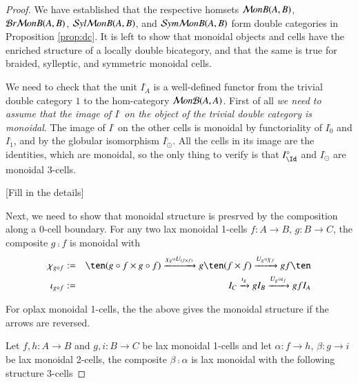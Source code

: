 \begin{proof}
We have established that the respective homsets $\mathcal{M} onB(A,B)$, $\mathcal{B} r \mathcal{M} onB(A,B)$, $\mathcal{S} yl \mathcal{M} onB(A,B)$, and $\mathcal{S} ym \mathcal{M} onB(A,B)$ form double categories in Proposition \ref{prop:dc}. It is left to show that monoidal objects and cells have the enriched structure of a locally double bicategory, and that the same is true for braided, sylleptic, and symmetric monoidal cells.

We need to check that the unit $I^{\comp}_A$ is a well-defined functor from the trivial double category $1$ to the hom-category $\mathcal{M} on\mathcal{B}(A,A)$. 
First of all {\it we need to assume that the image of $I^{\comp}$ on the object of the trivial double category is monoidal}. The image of $I^{\comp}$ on the other cells is monoidal by functoriality of $I^{\comp}_0$ and $I^{\comp}_1$, and by the globular isomorphism $I^{\comp}_{\odot}$.
All the cells in its image are the identities, which are monoidal, so the only thing to verify is that $I^{\comp}_{\looseid}$ and $I^{\comp}_{\odot}$ are monoidal 3-cells. 

[Fill in the details]

Next, we need to show that monoidal structure is presrved by the composition along a 0-cell boundary.
For any two lax monoidal 1-cells $f:A \rightarrow B$, $g:B \rightarrow C$, the composite $g \comp f$ is monoidal with 
\begin{align}
\chi_{g \comp f} &:= &\ten (g\comp f \times g\comp f) \xrightarrow{\chi_g \comp U_{(f \times f)}} g \ten (f \times f) \xrightarrow{U_g \comp \chi_f} gf\ten\\
\iota_{g \comp f} & := &I_C \xrightarrow{\iota_g} g I_B \xrightarrow{U_g \comp \iota_f} gfI_A
\end{align}

For oplax monoidal 1-cells, the the above gives the monoidal structure if the arrows are reversed.

Let $f,h: A \rightarrow B $ and $g,i: B \rightarrow C$ be lax monoidal 1-cells and let $\alpha: f \rightarrow h$, $\beta: g \rightarrow i$ be lax monoidal 2-cells, the composite $\beta \comp \alpha$ is lax monoidal with the following structure 3-cells


\end{proof}
